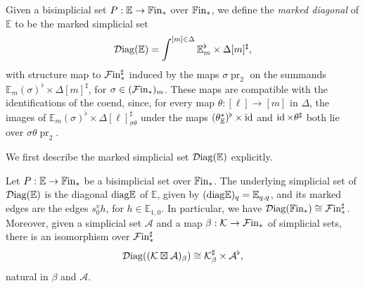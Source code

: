 \documentclass[10pt,reqno]{amsart}
\begin{document}
\begin{construction}
\label{const:marked_diagonal}
Given a bisimplicial set $P:\mathbb E\to\mathbb{F}\mathrm{in}_*$ over
$\mathbb{F}\mathrm{in}_*$, we define the \emph{marked diagonal} of $\mathbb E$ to
be the marked simplicial set
\[
 \mathcal{D}\mathrm{iag}(\mathbb E)=
 \int^{[m]\in\Delta}\mathbb E_m^\flat\times\Delta[m]^\sharp,
\]
with structure map to $\mathcal{F}\mathrm{in}_*^\sharp$ induced by the maps
$\sigma\operatorname{pr}_2$ on the summands
$\mathbb E_m(\sigma)^\flat\times\Delta[m]^\sharp$, for
$\sigma\in(\mathcal{F}\mathrm{in}_*)_m$. These maps are compatible with the
identifications of the coend, since, for every map
$\theta:[\ell]\to[m]$ in $\Delta$, the images of
$
 \mathbb E_m(\sigma)^\flat
 \times\Delta[\ell]^\sharp_{\sigma\theta}
$
under the maps $(\theta_{\mathbb E}^*)^\flat\times\operatorname{id}$ and
$\operatorname{id}\times\theta^\sharp$ both lie over
$\sigma\theta\operatorname{pr}_2$.
\end{construction}

We first describe the marked simplicial set $\mathcal{D}\mathrm{iag}(\mathbb E)$
explicitly.

\begin{proposition}
\label{prop:marked_diagonal_description}
Let $P:\mathbb E\to\mathbb{F}\mathrm{in}_*$ be a bisimplicial set over
$\mathbb{F}\mathrm{in}_*$. The underlying simplicial set of $\mathcal{D}\mathrm{iag}(\mathbb E)$ is
the diagonal $\mathrm{diag}\mathbb E$ of $\mathbb E$, given by
$(\mathrm{diag}\mathbb E)_q=\mathbb E_{q,q}$, and its marked edges are the
edges $s_0^v h$, for $h\in\mathbb E_{1,0}$. In particular, we have
$\mathcal{D}\mathrm{iag}(\mathbb{F}\mathrm{in}_*)\cong \mathcal{F}\mathrm{in}_*^\sharp$. Moreover, given a simplicial
set $\mathcal A$ and a map $\beta:\mathcal K\to \mathcal{F}\mathrm{in}_*$ of
simplicial sets, there is an isomorphism over $\mathcal{F}\mathrm{in}_*^\sharp$
\begin{equation}
\label{eq:marked_diagonal_external_product}
 \mathcal{D}\mathrm{iag}((\mathcal K\boxtimes \mathcal A)_\beta)
 \cong \mathcal K^\sharp_\beta\times \mathcal A^\flat,
\end{equation}
natural in $\beta$ and $\mathcal A$.
\end{proposition}
\end{document}
